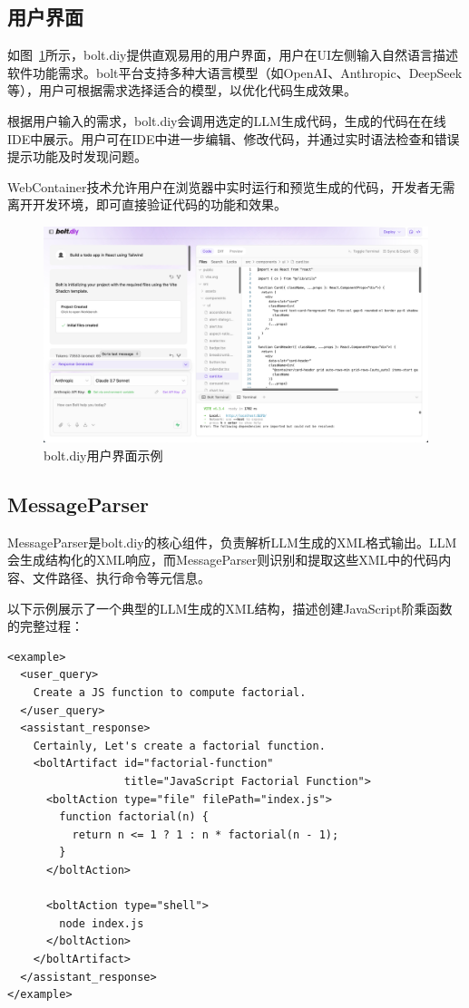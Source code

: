 
\subsection{用户界面}

如图~\ref{fig:bolt_diy_example}所示，bolt.diy提供直观易用的用户界面，用户在UI左侧输入自然语言描述软件功能需求。bolt平台支持多种大语言模型（如OpenAI、Anthropic、DeepSeek等），用户可根据需求选择适合的模型，以优化代码生成效果。

根据用户输入的需求，bolt.diy会调用选定的LLM生成代码，生成的代码在在线IDE中展示。用户可在IDE中进一步编辑、修改代码，并通过实时语法检查和错误提示功能及时发现问题。

WebContainer技术允许用户在浏览器中实时运行和预览生成的代码，开发者无需离开开发环境，即可直接验证代码的功能和效果。

\begin{figure}[htbp]
  \centering
  \includegraphics[width=\textwidth]{figures/bolt-diy-example.png}
  \caption{bolt.diy用户界面示例}
  \label{fig:bolt_diy_example}
\end{figure}

\subsection{MessageParser}

MessageParser是bolt.diy的核心组件，负责解析LLM生成的XML格式输出。LLM会生成结构化的XML响应，而MessageParser则识别和提取这些XML中的代码内容、文件路径、执行命令等元信息。

以下示例展示了一个典型的LLM生成的XML结构，描述创建JavaScript阶乘函数的完整过程：

\begin{verbatim}
<example>
  <user_query>
    Create a JS function to compute factorial.
  </user_query>
  <assistant_response>
    Certainly, Let's create a factorial function.
    <boltArtifact id="factorial-function" 
                  title="JavaScript Factorial Function">
      <boltAction type="file" filePath="index.js">
        function factorial(n) {
          return n <= 1 ? 1 : n * factorial(n - 1);
        }
      </boltAction>

      <boltAction type="shell">
        node index.js
      </boltAction>
    </boltArtifact>
  </assistant_response>
</example>
\end{verbatim}

